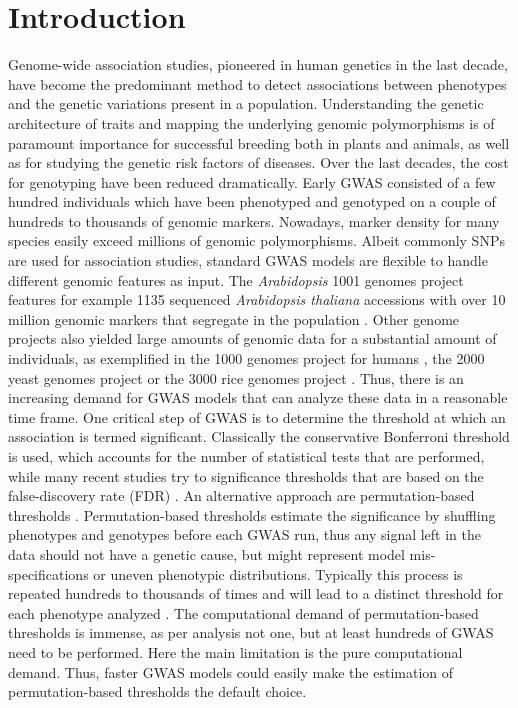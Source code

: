 \section{Introduction}
Genome-wide association studies, pioneered in human genetics \cite{Hirschhorn2005} in the last decade, have
become the predominant method to detect associations between phenotypes and the genetic variations present in
a population. Understanding the genetic architecture of traits and mapping the underlying genomic
polymorphisms is of paramount importance for successful breeding both in plants and animals, as well as for
studying the genetic risk factors of diseases. Over the last decades, the cost for genotyping have been
reduced dramatically. Early GWAS consisted of a few hundred individuals which have been phenotyped and
genotyped on a couple of hundreds to thousands of genomic markers. Nowadays, marker density for many species
easily exceed millions of genomic polymorphisms. Albeit commonly SNPs are used for association studies,
standard GWAS models are flexible to handle different genomic features as input. The \textit{Arabidopsis} 1001
genomes project features for example 1135 sequenced \textit{Arabidopsis thaliana} accessions with over 10
million genomic markers that segregate in the population \cite{1001genome}. Other genome projects also yielded
large amounts of genomic data for a substantial amount of individuals, as exemplified in the 1000 genomes
project for humans \cite{1000genome}, the 2000 yeast genomes project or the 3000 rice genomes project
\cite{3000genome}. Thus, there is an increasing demand for GWAS models that can analyze these data in a
reasonable time frame. One critical step of GWAS is to determine the threshold at which an association is
termed significant. Classically the conservative Bonferroni threshold is used, which accounts for the number
of statistical tests that are performed, while many recent studies try to significance thresholds that are
based on the false-discovery rate (FDR) \cite{Storey9440}. An alternative approach are permutation-based
thresholds \cite{che2014adaptive}. Permutation-based thresholds estimate the significance by shuffling
phenotypes and genotypes before each GWAS run, thus any signal left in the data should not have a genetic
cause, but might represent model mis-specifications or uneven phenotypic distributions. Typically this process
is repeated hundreds to thousands of times and will lead to a distinct threshold for each phenotype analyzed
\cite{togninalli2017aragwas}. The computational demand of permutation-based thresholds is immense, as per
analysis not one, but at least hundreds of GWAS need to be performed. Here the main limitation is the pure
computational demand. Thus, faster GWAS models could easily make the estimation of permutation-based
thresholds the default choice.

